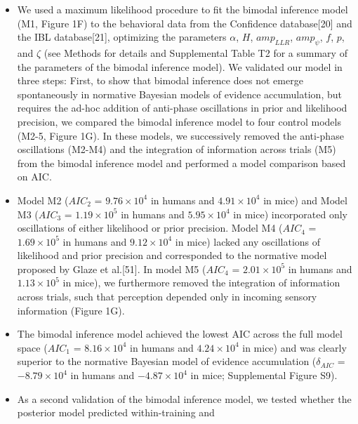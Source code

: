 \documentclass[
]{article}
\begin{document}
\begin{itemize}
\item
  We used a maximum likelihood procedure to fit the bimodal inference
  model (M1, Figure 1F) to the behavioral data from the Confidence
  database{[}20{]} and the IBL database{[}21{]}, optimizing the
  parameters \(\alpha\), \(H\), \(amp_{LLR}\), \(amp_{\psi}\), \(f\),
  \(p\), and \(\zeta\) (see Methods for details and Supplemental Table
  T2 for a summary of the parameters of the bimodal inference model). We
  validated our model in three steps: First, to show that bimodal
  inference does not emerge spontaneously in normative Bayesian models
  of evidence accumulation, but requires the ad-hoc addition of
  anti-phase oscillations in prior and likelihood precision, we compared
  the bimodal inference model to four control models (M2-5, Figure 1G).
  In these models, we successively removed the anti-phase oscillations
  (M2-M4) and the integration of information across trials (M5) from the
  bimodal inference model and performed a model comparison based on AIC.
\item
  Model M2 (\(AIC_2\) = \(\ensuremath{9.76\times 10^{4}}\) in humans and
  \(\ensuremath{4.91\times 10^{4}}\) in mice) and Model M3 (\(AIC_3\) =
  \(\ensuremath{1.19\times 10^{5}}\) in humans and
  \(\ensuremath{5.95\times 10^{4}}\) in mice) incorporated only
  oscillations of either likelihood or prior precision. Model M4
  (\(AIC_4\) = \(\ensuremath{1.69\times 10^{5}}\) in humans and
  \(\ensuremath{9.12\times 10^{4}}\) in mice) lacked any oscillations of
  likelihood and prior precision and corresponded to the normative model
  proposed by Glaze et al.{[}51{]}. In model M5 (\(AIC_4\) =
  \(\ensuremath{2.01\times 10^{5}}\) in humans and
  \(\ensuremath{1.13\times 10^{5}}\) in mice), we furthermore removed
  the integration of information across trials, such that perception
  depended only in incoming sensory information (Figure 1G).
\item
  The bimodal inference model achieved the lowest AIC across the full
  model space (\(AIC_1\) = \(\ensuremath{8.16\times 10^{4}}\) in humans
  and \(\ensuremath{4.24\times 10^{4}}\) in mice) and was clearly
  superior to the normative Bayesian model of evidence accumulation
  (\(\delta_{AIC}\) = \(\ensuremath{-8.79\times 10^{4}}\) in humans and
  \(\ensuremath{-4.87\times 10^{4}}\) in mice; Supplemental Figure S9).
\item
  As a second validation of the bimodal inference model, we tested
  whether the posterior model predicted within-training and

\end{itemize}
\end{document}
